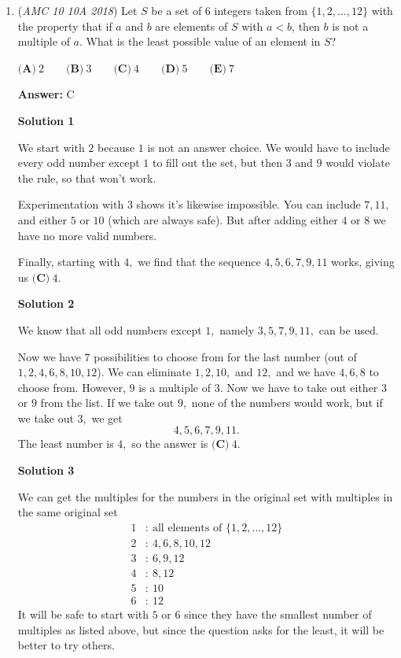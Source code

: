 \begin{enumerate}
	\item (\textit{AMC 10 10A 2018}) Let $S$ be a set of $6$ integers taken from $\{1,2,\dots,12\}$ with the property that if $a$ and $b$ are elements of $S$ with $a<b$, then $b$ is not a multiple of $a$. What is the least possible value of an element in $S$?


 $\textbf{(A)}\ 2\qquad\textbf{(B)}\ 3\qquad\textbf{(C)}\ 4\qquad\textbf{(D)}\ 5\qquad\textbf{(E)}\ 7$

 \textbf{Answer: }C



\textbf{Solution 1}

We start with $2$ because $1$ is not an answer choice. We would have to include every odd number except $1$ to fill out the set, but then $3$ and $9$ would violate the rule, so that won't work.

 Experimentation with $3$ shows it's likewise impossible. You can include $7,11,$ and either $5$ or $10$ (which are always safe). But after adding either $4$ or $8$ we have no more valid numbers.

 Finally, starting with $4,$ we find that the sequence $4,5,6,7,9,11$ works, giving us $\boxed{\textbf{(C)}\ 4}.$




\textbf{Solution 2}

We know that all odd numbers except $1,$ namely $3, 5, 7, 9, 11,$ can be used.

 Now we have $7$ possibilities to choose from for the last number (out of $1, 2, 4, 6, 8, 10, 12$). We can eliminate $1, 2, 10,$ and $12,$ and we have $4, 6, 8$ to choose from. However, $9$ is a multiple of $3.$ Now we have to take out either $3$ or $9$ from the list. If we take out $9,$ none of the numbers would work, but if we take out $3,$ we get 
 \[4, 5, 6, 7, 9, 11.\]The least number is $4,$ so the answer is $\boxed{\textbf{(C)}\ 4}.$




\textbf{Solution 3}

We can get the multiples for the numbers in the original set with multiples in the same original set
 \begin{align*} 1&: \ \text{all elements of }\{1,2,\dots,12\} \\ 2&: \ 4,6,8,10,12 \\ 3&: \ 6,9,12 \\ 4&: \ 8,12 \\ 5&: \ 10 \\ 6&: \ 12 \end{align*}
It will be safe to start with $5$ or $6$ since they have the smallest number of multiples as listed above, but since the question asks for the least, it will be better to try others.


\end{enumerate}
